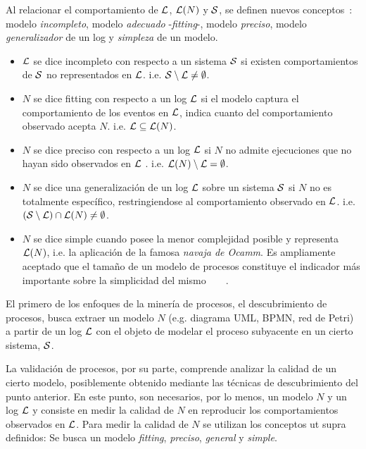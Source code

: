 Al relacionar el comportamiento de ${\mathcal L}$, $\mathcal{L}(N)$ y $\mathcal{S}$, se definen nuevos conceptos~\cite{BuijsDA14}: modelo \emph{incompleto},
modelo \emph{adecuado} -\textit{fitting}-, modelo \emph{preciso}, modelo \emph{generalizador} de un log y \emph{simpleza} de un modelo.

\begin{itemize}
  \item ${\mathcal L}$ se dice incompleto con respecto a un sistema $\mathcal{S}$ si existen comportamientos
        de $\mathcal{S}$ no representados en ${\mathcal L}$.
        i.e. ${\mathcal{S}} \setminus {\mathcal L} \ne \emptyset$.
  \item $N$ se dice fitting con respecto a un log ${\mathcal L}$ si el modelo captura el comportamiento 
        de los eventos en ${\mathcal L}$, indica cuanto del comportamiento observado acepta $N$. 
        i.e. ${\mathcal L} \subseteq \mathcal{L}(N)$.
  \item $N$ se dice preciso con respecto a un log ${\mathcal L}$ si $N$ no admite ejecuciones que no hayan
        sido observados en ${\mathcal L}$ .
        i.e. $\mathcal{L}(N) \setminus {\mathcal L} = \emptyset$.
  \item $N$ se dice una generalización de un log ${\mathcal L}$ sobre un sistema $\mathcal{S}$ si $N$
        no es totalmente específico, restringiendose al comportamiento observado en ${\mathcal L}$.
        i.e. $({\mathcal{S}} \setminus {\mathcal L}) \cap \mathcal{L}(N) \neq \emptyset$.
  \item $N$ se dice simple cuando posee la menor complejidad posible y representa $\mathcal{L}(N)$,
        i.e. la aplicación de la famosa \emph{navaja de Ocamm}.
        Es ampliamente aceptado que el tamaño de un modelo de procesos constituye el indicador más importante
        sobre la simplicidad del mismo~\cite{AalstBook}~\cite{Aalst2012}~\cite{LeonRCHH15}~\cite{CarmonaC14}.
\end{itemize}

El primero de los enfoques de la minería de procesos, el descubrimiento de procesos, busca extraer un modelo $N$
(e.g. diagrama UML, BPMN, red de Petri) a partir de un log ${\mathcal L}$ con el objeto de modelar
el proceso subyacente en un cierto sistema, $\mathcal{S}$. 

La validación de procesos, por su parte, comprende analizar la calidad de un cierto modelo,
posiblemente obtenido mediante las técnicas de descubrimiento del punto anterior. En este punto, 
son necesarios, por lo menos, un modelo $N$ y un log ${\mathcal L}$ y consiste en medir la calidad 
de $N$ en reproducir los comportamientos observados en ${\mathcal L}$. Para medir la calidad de $N$ se 
utilizan los conceptos ut supra definidos:
Se busca un modelo \emph{fitting}, \emph{preciso}, \emph{general} y \emph{simple}.

